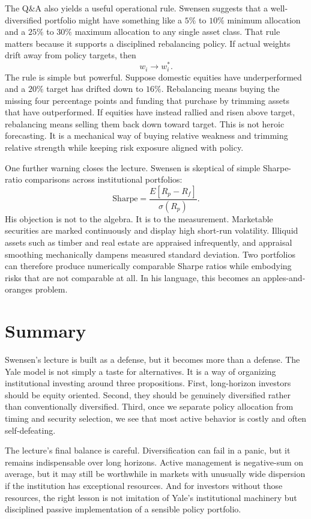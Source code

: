 The Q\&A also yields a useful operational rule. Swensen suggests that a well-diversified portfolio might have something like a \(5\%\) to \(10\%\) minimum allocation and a \(25\%\) to \(30\%\) maximum allocation to any single asset class. That rule matters because it supports a disciplined rebalancing policy. If actual weights drift away from policy targets, then
\begin{equation}
w_i \to w_i^{*}.
\end{equation}
The rule is simple but powerful. Suppose domestic equities have underperformed and a \(20\%\) target has drifted down to \(16\%\). Rebalancing means buying the missing four percentage points and funding that purchase by trimming assets that have outperformed. If equities have instead rallied and risen above target, rebalancing means selling them back down toward target. This is not heroic forecasting. It is a mechanical way of buying relative weakness and trimming relative strength while keeping risk exposure aligned with policy.

One further warning closes the lecture. Swensen is skeptical of simple Sharpe-ratio comparisons across institutional portfolios:
\begin{equation}
\text{Sharpe}=\frac{E[R_p-R_f]}{\sigma(R_p)}.
\end{equation}
His objection is not to the algebra. It is to the measurement. Marketable securities are marked continuously and display high short-run volatility. Illiquid assets such as timber and real estate are appraised infrequently, and appraisal smoothing mechanically dampens measured standard deviation. Two portfolios can therefore produce numerically comparable Sharpe ratios while embodying risks that are not comparable at all. In his language, this becomes an apples-and-oranges problem.

\section{Summary}

Swensen's lecture is built as a defense, but it becomes more than a defense. The Yale model is not simply a taste for alternatives. It is a way of organizing institutional investing around three propositions. First, long-horizon investors should be equity oriented. Second, they should be genuinely diversified rather than conventionally diversified. Third, once we separate policy allocation from timing and security selection, we see that most active behavior is costly and often self-defeating.

The lecture's final balance is careful. Diversification can fail in a panic, but it remains indispensable over long horizons. Active management is negative-sum on average, but it may still be worthwhile in markets with unusually wide dispersion if the institution has exceptional resources. And for investors without those resources, the right lesson is not imitation of Yale's institutional machinery but disciplined passive implementation of a sensible policy portfolio.